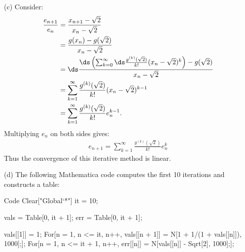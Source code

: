 \documentclass[12pt,twoside,openany]{memoir}
\begin{document}
\begin{solution}
        (c) Consider:
            \begin{equation*}
            \begin{split}
                \frac{e_{n+1}}{e_n}
                & = \frac{x_{n+1} - \sqrt{2}}{x_n - \sqrt{2}} \\
                & = \frac{g(x_n) - g(\sqrt{2})}{x_n - \sqrt{2}} \\
                & = \ds \frac{\ds \left( \sum_{k = 0}^\infty \ds \frac{g^{(k)}(\sqrt{2})}{k!} (x_n - \sqrt{2})^k \right) - g(\sqrt{2})}{x_n - \sqrt{2}} \\
                & = \sum_{k = 1}^\infty \frac{g^{(k)}(\sqrt{2})}{k!}(x_n - \sqrt{2})^{k-1} \\
                & = \sum_{k = 1}^\infty \frac{g^{(k)}(\sqrt{2})}{k!}e_n^{k-1}.
            \end{split}
            \end{equation*}
        Multiplying $e_n$ on both sides gives:
            \begin{equation*}
            \begin{split}
                e_{n+1} = \sum_{k = 1}^\infty \frac{g^{(k)}(\sqrt{2})}{k!}e_n^k 
            \end{split}
            \end{equation*}
        Thus the convergence of this iterative method is linear. \nl

        \newpage
        (d) The following Mathematica code computes the first 10 iterations and constructs a table:

\begin{mmaCell}[functionlocal = y]{Code}
Clear["Global`*"]
it = 10;

vals = Table[0, {it + 1}];
err = Table[0, {it + 1}];

vals[[1]] = 1;
For[n = 1, n <= it, n++, 
  vals[[n + 1]] = N[1 + 1/(1 + vals[[n]]), 1000];];
For[n = 1, n <= it + 1, n++, err[[n]] = N[vals[[n]] - Sqrt[2], 1000];];


\end{mmaCell}
\end{solution}
\end{document}
